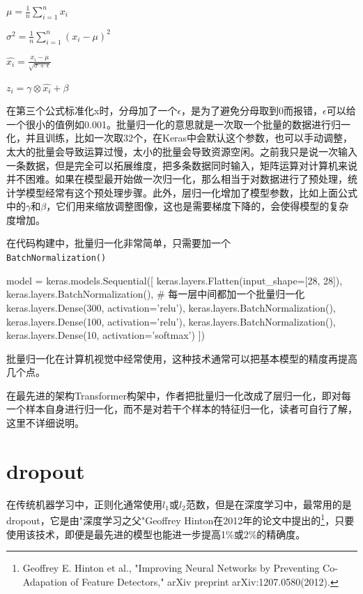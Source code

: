 \documentclass[a5paper, 11pt]{ctexbook}
\begin{document}
$\mu = \frac{1}{n}\sum^{n}_{i=1}x_i$

$\sigma^2 = \frac{1}{n}\sum^{n}_{i=1}(x_i-\mu)^2$

$\hat{x_i} = \frac{x_i-\mu}{\sqrt{\sigma+\epsilon}}$

$z_i = \gamma\otimes\hat{x_i}+\beta$

在第三个公式标准化x时，分母加了一个$\epsilon$，是为了避免分母取到0而报错，$\epsilon$可以给一个很小的值例如0.001。批量归一化的意思就是一次取一个批量的数据进行归一化，并且训练，比如一次取32个，在Keras中会默认这个参数，也可以手动调整，太大的批量会导致运算过慢，太小的批量会导致资源空闲。之前我只是说一次输入一条数据，但是完全可以拓展维度，把多条数据同时输入，矩阵运算对计算机来说并不困难。如果在模型最开始做一次归一化，那么相当于对数据进行了预处理，统计学模型经常有这个预处理步骤。此外，层归一化增加了模型参数，比如上面公式中的$\gamma$和$\beta$，它们用来缩放调整图像，这也是需要梯度下降的，会使得模型的复杂度增加。

在代码构建中，批量归一化非常简单，只需要加一个\\
\verb|BatchNormalization()|

\begin{python}
    model = keras.models.Sequential([
    keras.layers.Flatten(input_shape=[28, 28]),
    keras.layers.BatchNormalization(),
    # 每一层中间都加一个批量归一化
    keras.layers.Dense(300, activation='relu'),
    keras.layers.BatchNormalization(),
    keras.layers.Dense(100, activation='relu'),
    keras.layers.BatchNormalization(),
    keras.layers.Dense(10, activation='softmax')
    ])
\end{python}

批量归一化在计算机视觉中经常使用，这种技术通常可以把基本模型的精度再提高几个点。

在最先进的架构Transformer构架中，作者把批量归一化改成了层归一化，即对每一个样本自身进行归一化，而不是对若干个样本的特征归一化，读者可自行了解，这里不详细说明。

\section{dropout}

在传统机器学习中，正则化通常使用$l_1$或$l_2$范数，但是在深度学习中，最常用的是dropout，它是由"深度学习之父"Geoffrey Hinton在2012年的论文中提出的\footnote{Geoffrey E. Hinton et al., "Improving Neural Networks by Preventing Co-Adapation of Feature Detectors," arXiv preprint arXiv:1207.0580(2012).}，只要使用该技术，即便是最先进的模型也能进一步提高1\%或2\%的精确度。
\end{document}
